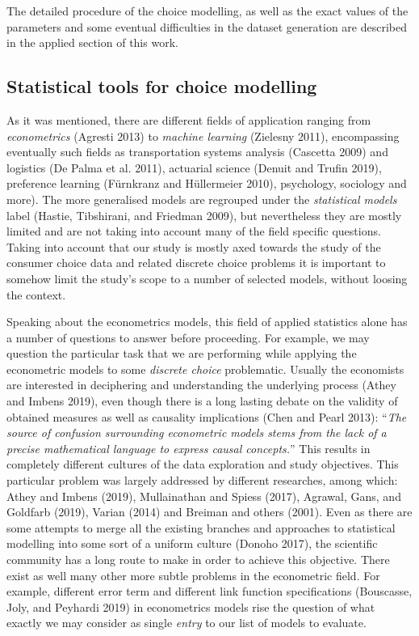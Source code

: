 \documentclass[11pt,]{article}
\begin{document}
The detailed procedure of the choice modelling, as well as the exact
values of the parameters and some eventual difficulties in the dataset
generation are described in the applied section of this work.

\hypertarget{statistical-tools-for-choice-modelling}{%
\subsection{Statistical tools for choice
modelling}\label{statistical-tools-for-choice-modelling}}

As it was mentioned, there are different fields of application ranging
from \emph{econometrics} (Agresti 2013) to \emph{machine learning}
(Zielesny 2011), encompassing eventually such fields as transportation
systems analysis (Cascetta 2009) and logistics (De Palma et al. 2011),
actuarial science (Denuit and Trufin 2019), preference learning
(Fürnkranz and Hüllermeier 2010), psychology, sociology and more). The
more generalised models are regrouped under the \emph{statistical
models} label (Hastie, Tibshirani, and Friedman 2009), but nevertheless
they are mostly limited and are not taking into account many of the
field specific questions. Taking into account that our study is mostly
axed towards the study of the consumer choice data and related discrete
choice problems it is important to somehow limit the study's scope to a
number of selected models, without loosing the context.

Speaking about the econometrics models, this field of applied statistics
alone has a number of questions to answer before proceeding. For
example, we may question the particular task that we are performing
while applying the econometric models to some \emph{discrete choice}
problematic. Usually the economists are interested in deciphering and
understanding the underlying process (Athey and Imbens 2019), even
though there is a long lasting debate on the validity of obtained
measures as well as causality implications (Chen and Pearl 2013):
``\emph{The source of confusion surrounding econometric models stems
from the lack of a precise mathematical language to express causal
concepts.}'' This results in completely different cultures of the data
exploration and study objectives. This particular problem was largely
addressed by different researches, among which: Athey and Imbens (2019),
Mullainathan and Spiess (2017), Agrawal, Gans, and Goldfarb (2019),
Varian (2014) and Breiman and others (2001). Even as there are some
attempts to merge all the existing branches and approaches to
statistical modelling into some sort of a uniform culture (Donoho 2017),
the scientific community has a long route to make in order to achieve
this objective. There exist as well many other more subtle problems in
the econometric field. For example, different error term and different
link function specifications (Bouscasse, Joly, and Peyhardi 2019) in
econometrics models rise the question of what exactly we may consider as
single \emph{entry} to our list of models to evaluate.
\end{document}
